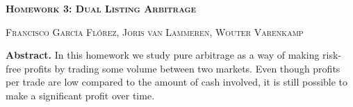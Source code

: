 \documentclass[8 pt]{article}
\begin{document}
\begin{minipage}{\textwidth}
    \centering
    \Large \textbf{\textsc{Homework 3: Dual Listing Arbitrage}}
    \vspace{0.5cm}

    \small \textsc{Francisco García Flórez, Joris van Lammeren, Wouter Varenkamp}
    \vspace{0.5cm}

    \begin{minipage}{0.8\textwidth}
      \textbf{Abstract.} In this homework we study pure arbitrage as a way of making risk-free profits by trading some volume between two markets. Even though profits per trade are low compared to the amount of cash involved, it is still possible to make a significant profit over time.
    \end{minipage}
\end{minipage}

\vspace{0.5cm}
\end{document}
